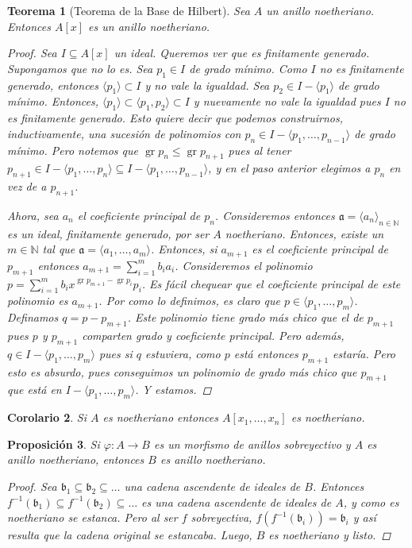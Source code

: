 \documentclass[12pt]{book}
\newtheorem{teo}{Teorema}[section]
\newtheorem{prop}[teo]{Proposición}
\newtheorem{cor}[teo]{Corolario}
\theoremstyle{definition}
\newcommand{\NN}{\mathbb{N}}
\DeclareMathOperator{\gr}{gr}
\begin{document}
\begin{teo}[Teorema de la Base de Hilbert]
Sea $A$ un anillo noetheriano. Entonces $A[x]$ es un anillo noetheriano.
\begin{proof}
Sea $I\subseteq A[x]$ un ideal. Queremos ver que es finitamente generado. Supongamos que no lo es. Sea $p_1\in I$ de grado mínimo. Como $I$ no es finitamente generado, entonces $\langle p_1\rangle \subset I$ y no vale la igualdad. Sea $p_2\in I-\langle p_1\rangle$ de grado mínimo. Entonces, $\langle p_1\rangle \subset \langle p_1,p_2\rangle \subset I$ y nuevamente no vale la igualdad pues $I$ no es finitamente generado. Esto quiere decir que podemos construirnos, inductivamente, una sucesión de polinomios con $p_n \in I - \langle p_1,\ldots , p_{n-1}\rangle$ de grado mínimo. Pero notemos que $\gr p_n\leq \gr p_{n+1}$ pues al tener $p_{n+1}\in I - \langle p_1,\ldots , p_n\rangle\subseteq I - \langle p_1,\ldots , p_{n-1}\rangle$, y en el paso anterior elegimos a $p_n$ en vez de a $p_{n+1}$. 

Ahora, sea $a_n$ el coeficiente principal de $p_n$. Consideremos entonces $\mathfrak{a}=\langle a_n\rangle_{n\in\NN}$ es un ideal, finitamente generado, por ser $A$ noetheriano. Entonces, existe un $m\in\NN$ tal que $\mathfrak{a} = \langle a_1,\ldots , a_m\rangle$. Entonces, si $a_{m+1}$ es el coeficiente principal de $p_{m+1}$ entonces $a_{m+1} = \displaystyle\sum_{i=1}^{m}b_i a_i$. Consideremos el polinomio $p=\displaystyle\sum_{i=1}^m b_ix^{\gr p_{m+1} - \gr p_i}p_i$. Es fácil chequear que el coeficiente principal de este polinomio es $a_{m+1}$. Por como lo definimos, es claro que $p\in\langle p_1,\ldots , p_m\rangle$. Definamos $q = p - p_{m+1}$. Este polinomio tiene grado más chico que el de $p_{m+1}$ pues $p$ y $p_{m+1}$ comparten grado y coeficiente principal. Pero además, $q\in I - \langle p_1,\ldots , p_m\rangle$ pues si $q$ estuviera, como $p$ está entonces $p_{m+1}$ estaría. Pero esto es absurdo, pues conseguimos un polinomio de grado más chico que $p_{m+1}$ que está en $I-\langle p_1,\ldots , p_{m}\rangle$. Y estamos.
\end{proof}
\end{teo}

\begin{cor}
Si $A$ es noetheriano entonces $A[x_1,\ldots , x_n]$ es noetheriano.
\end{cor}

\begin{prop}
Si $\varphi:A\to B$ es un morfismo de anillos sobreyectivo y $A$ es anillo noetheriano, entonces $B$ es anillo noetheriano.
\begin{proof}
Sea $\mathfrak{b}_1\subseteq \mathfrak{b}_2\subseteq \ldots$ una cadena ascendente de ideales de $B$. Entonces $f^{-1}(\mathfrak{b}_1)\subseteq f^{-1}(\mathfrak{b}_2)\subseteq \ldots$ es una cadena ascendente de ideales de $A$, y como es noetheriano se estanca. Pero al ser $f$ sobreyectiva, $f(f^{-1}(\mathfrak{b}_i)) = \mathfrak{b}_i$ y así resulta que la cadena original se estancaba. Luego, $B$ es noetheriano y listo.
\end{proof}
\end{prop}
\end{document}
